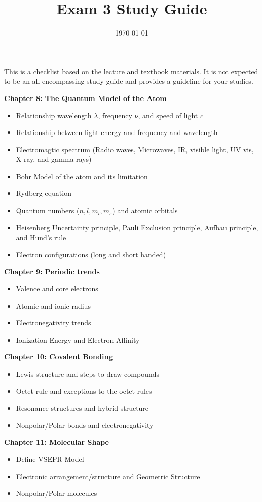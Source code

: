 \documentclass[12pt]{article}
\title{\textbf{Exam 3 Study Guide}}
\date{\today}
\begin{document}
\maketitle 

This is a checklist based on the lecture and textbook materials. It is not
expected to be an all encompassing study guide and provides a guideline for
your studies.

\textbf{Chapter 8: The Quantum Model of the Atom}

\begin{itemize}
  \setlength\itemsep{0em}
\item Relationship wavelength $\lambda$, frequency $\nu$, and speed of light $c$
\item Relationship between light energy and frequency and wavelength
\item Electromagtic spectrum (Radio waves, Microwaves, IR, visible light, UV vis, X-ray, and gamma rays)
\item Bohr Model of the atom and its limitation
\item Rydberg equation
\item Quantum numbers ($n, l, m_l, m_s$) and atomic orbitals
\item Heisenberg Uncertainty principle, Pauli Exclusion principle, Aufbau principle, and
  Hund's rule
\item Electron configurations (long and short handed)
\end{itemize}

\textbf{Chapter 9: Periodic trends}

\begin{itemize}
  \setlength\itemsep{0em}
\item Valence and core electrons
\item Atomic and ionic radius
\item Electronegativity trends
\item Ionization Energy and Electron Affinity
\end{itemize}

\textbf{Chapter 10: Covalent Bonding}

\begin{itemize}
  \setlength\itemsep{0em}
\item Lewis structure and steps to draw compounds
\item Octet rule and exceptions to the octet rules
\item Resonance structures and hybrid structure
\item Nonpolar/Polar bonds and electronegativity
\end{itemize}

\textbf{Chapter 11: Molecular Shape}

\begin{itemize}
  \setlength\itemsep{0em}
\item Define VSEPR Model
\item Electronic arrangement/structure and Geometric Structure
\item Nonpolar/Polar molecules
\end{itemize}
\end{document}
